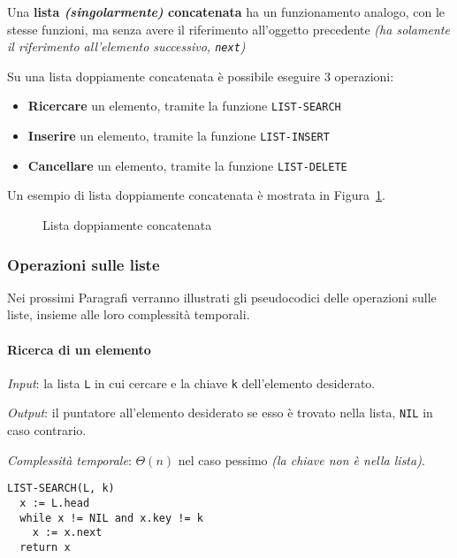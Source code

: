 \documentclass[italian, 10pt]{article}
\begin{document}
Una \textbf{lista \textit{(singolarmente)} concatenata} ha un funzionamento analogo, con le stesse funzioni, ma senza avere il riferimento all'oggetto precedente \textit{(ha solamente il riferimento all'elemento successivo, \texttt{next})}

\bigskip
Su una lista doppiamente concatenata è possibile eseguire \(3\) operazioni:

\begin{itemize}
  \item \textbf{Ricercare} un elemento, tramite la funzione \texttt{LIST-SEARCH}
  \item \textbf{Inserire} un elemento, tramite la funzione \texttt{LIST-INSERT}
  \item \textbf{Cancellare} un elemento, tramite la funzione \texttt{LIST-DELETE}
\end{itemize}

\bigskip
Un esempio di lista doppiamente concatenata è mostrata in Figura~\ref{fig:lista-doppiamente-concatenata}.

\begin{figure}[htbp]
  \bigskip
  \centering
  \caption{Lista doppiamente concatenata}
  \label{fig:lista-doppiamente-concatenata}
  \bigskip
\end{figure}

\subsubsection{Operazioni sulle liste}

Nei prossimi Paragrafi verranno illustrati gli pseudocodici delle operazioni sulle liste, insieme alle loro complessità temporali.

\paragraph{Ricerca di un elemento}

\textit{Input}: la lista \texttt{L} in cui cercare e la chiave \texttt{k} dell'elemento desiderato.

\textit{Output}: il puntatore all'elemento desiderato se esso è trovato nella lista, \texttt{NIL} in caso contrario.

\textit{Complessità temporale}: \(\Theta(n)\) nel caso pessimo \textit{(la chiave non è nella lista)}.

\begin{lstlisting}[float, style=pseudocode, caption={Pseudocodice dell'algoritmo \texttt{LIST-SEARCH}}, label={lst:list-search}]
LIST-SEARCH(L, k)
  x := L.head
  while x != NIL and x.key != k
    x := x.next
  return x
\end{lstlisting}
\end{document}
